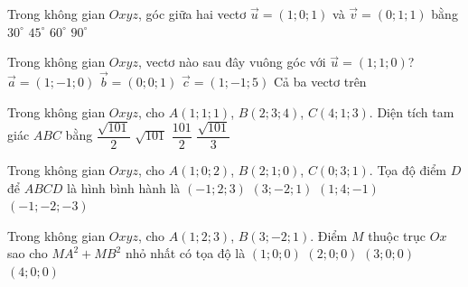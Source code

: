 \begin{ex}
  Trong không gian $Oxyz$, góc giữa hai vectơ $\vec u=(1;0;1)$ và $\vec v=(0;1;1)$ bằng
  \choice
    {$30^\circ$}
    {$45^\circ$}
    {\True $60^\circ$}
    {$90^\circ$}
\end{ex}

\begin{ex}
  Trong không gian $Oxyz$, vectơ nào sau đây vuông góc với $\vec u=(1;1;0)$?
  \choice
    {$\vec a=(1;-1;0)$}
    {$\vec b=(0;0;1)$}
    {$\vec c=(1;-1;5)$}
    {\True\Pin Cả ba vectơ trên}
\end{ex}

\begin{ex}
  Trong không gian $Oxyz$, cho $A(1;1;1)$, $B(2;3;4)$, $C(4;1;3)$. Diện tích tam giác $ABC$ bằng
  \choice
    {\True $\dfrac{\sqrt{101}}{2}$}
    {$\sqrt{101}$}
    {$\dfrac{101}{2}$}
    {$\dfrac{\sqrt{101}}{3}$}
\end{ex}

\begin{ex}
  Trong không gian $Oxyz$, cho $A(1;0;2)$, $B(2;1;0)$, $C(0;3;1)$. Tọa độ điểm $D$ để $ABCD$ là hình bình hành là
  \choice
    {\True $(-1;2;3)$}
    {$(3;-2;1)$}
    {$(1;4;-1)$}
    {$(-1;-2;-3)$}
\end{ex}

\begin{ex}
  Trong không gian $Oxyz$, cho $A(1;2;3)$, $B(3;-2;1)$. Điểm $M$ thuộc trục $Ox$ sao cho $MA^2+MB^2$ nhỏ nhất có tọa độ là
  \choice
    {$(1;0;0)$}
    {\True $(2;0;0)$}
    {$(3;0;0)$}
    {$(4;0;0)$}
\end{ex}

